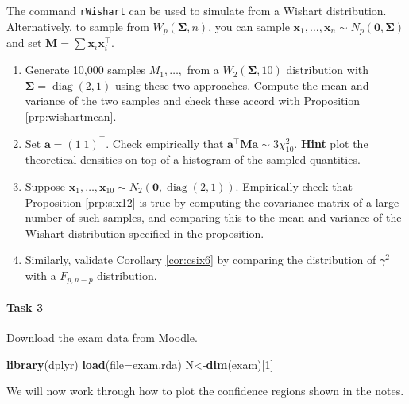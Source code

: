\documentclass[
]{book}
\newenvironment{Shaded}{\begin{snugshade}}{\end{snugshade}}
\newcommand{\AttributeTok}[1]{\textcolor[rgb]{0.13,0.29,0.53}{#1}}
\newcommand{\DecValTok}[1]{\textcolor[rgb]{0.00,0.00,0.81}{#1}}
\newcommand{\FunctionTok}[1]{\textcolor[rgb]{0.13,0.29,0.53}{\textbf{#1}}}
\newcommand{\NormalTok}[1]{#1}
\newcommand{\OtherTok}[1]{\textcolor[rgb]{0.56,0.35,0.01}{#1}}
\newcommand{\StringTok}[1]{\textcolor[rgb]{0.31,0.60,0.02}{#1}}
\theoremstyle{definition}
\theoremstyle{definition}
\theoremstyle{definition}
\theoremstyle{definition}
\theoremstyle{remark}
\begin{document}
The command \texttt{rWishart} can be used to simulate from a Wishart distribution. Alternatively, to sample from \(W_p(\boldsymbol{\Sigma},n)\), you can sample \(\mathbf x_1, \ldots, \mathbf x_n \sim N_p({\boldsymbol 0}, \boldsymbol{\Sigma})\) and set \(\mathbf M= \sum \mathbf x_i \mathbf x_i^\top\).

\begin{enumerate}
\def\labelenumi{\roman{enumi}.}
\item
  Generate 10,000 samples \(M_1, \ldots,\) from a \(W_2(\boldsymbol{\Sigma}, 10)\) distribution with \(\boldsymbol{\Sigma}= \operatorname{diag}(2,1)\) using these two approaches. Compute the mean and variance of the two samples and check these accord with Proposition \ref{prp:wishartmean}.
\item
  Set \(\mathbf a= (1\; 1)^\top\). Check empirically that \(\mathbf a^\top \mathbf M\mathbf a\sim 3 \chi^2_{10}\).
  \textbf{Hint} plot the theoretical densities on top of a histogram of the sampled quantities.
\item
  Suppose \(\mathbf x_1, \ldots, \mathbf x_{10} \sim N_2({\boldsymbol 0}, \operatorname{diag}(2,1))\). Empirically check that Proposition \ref{prp:six12} is true by computing the covariance matrix of a large number of such samples, and comparing this to the mean and variance of the Wishart distribution specified in the proposition.
\item
  Similarly, validate Corollary \ref{cor:csix6} by comparing the distribution of \(\gamma^2\) with a \(F_{p, n-p}\) distribution.
\end{enumerate}

\paragraph*{Task 3}\label{task-3-2}

Download the exam data from Moodle.

\begin{Shaded}
\begin{Highlighting}[]
\FunctionTok{library}\NormalTok{(dplyr)}
\FunctionTok{load}\NormalTok{(}\AttributeTok{file=}\StringTok{\textquotesingle{}exam.rda\textquotesingle{}}\NormalTok{)}
\NormalTok{N}\OtherTok{\textless{}{-}}\FunctionTok{dim}\NormalTok{(exam)[}\DecValTok{1}\NormalTok{]}
\end{Highlighting}
\end{Shaded}

We will now work through how to plot the confidence regions shown in the notes.
\end{document}
